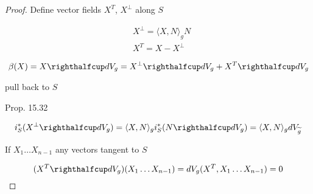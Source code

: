 \begin{proof}
Define vector fields $X^T$, $X^{\perp}$ along $S$

\[
\begin{aligned}
&  X^{\perp} = \langle X, N\rangle_g N \\ 
&  X^T =  X - X^{\perp}
\end{aligned}
\]

\[
\beta(X) = X \righthalfcup dV_g = X^{\perp} \righthalfcup dV_g + X^T \righthalfcup dV_g
\]

pull back to $S$

Prop. 15.32


\[
i^*_S{ (X^{\perp} \righthalfcup dV_g) }  = \langle X, N \rangle_g i^*_S{ (N \righthalfcup dV_g) } = \langle X, N \rangle_g dV_{ \widetilde{g}}
\]

If $X_1 \dots X_{n-1}$ any vectors tangent to $S$

\[
(X^T \righthalfcup dV_g){ (X_1 \dots X_{n-1} ) } = dV_g{ (X^T, X_1 \dots X_{n-1} ) } = 0 
\]



\end{proof}

